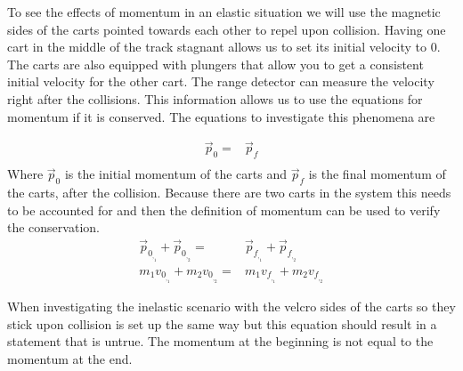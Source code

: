 \documentclass{article}
\begin{document}
    To see the effects of momentum in an elastic situation we will use the magnetic sides of the carts pointed towards each other to repel upon collision. Having one cart in the middle of the track stagnant allows us to set its initial velocity to 0. The carts are also equipped with plungers that allow you to get a consistent initial velocity for the other cart. The range detector can measure the velocity right after the collisions. This information allows us to use the equations for momentum if it is conserved. The equations to investigate this phenomena are 

    \begin{align*}
        \Vec{p}_0 =&  \Vec{p}_f\\
    \end{align*}
    Where $\Vec{p}_0$ is the initial momentum of the carts and $\Vec{p}_f$ is the final momentum of the carts, after the collision. Because there are two carts in the system this needs to be accounted for and then the definition of momentum can be used to verify the conservation.
    \begin{align*} 
        \Vec{p}_0_,_1 + \Vec{p}_0_,_2 =&  \Vec{p}_f_,_1 + \Vec{p}_f_,_2\\
        m_1v_0_,_1 + m_2v_0_,_2 =& m_1v_f_,_1 + m_2v_f_,_2
    \end{align*}

    When investigating the inelastic scenario with the velcro sides of the carts so they stick upon collision is set up the same way but this equation should result in a statement that is untrue. The momentum at the beginning is not equal to the momentum at the end.
\end{document}
